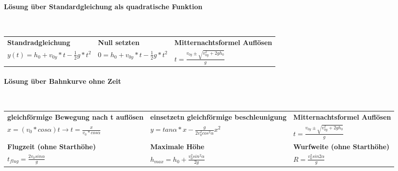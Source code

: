 \documentclass[10pt,a4paper]{article}
\begin{document}
        \paragraph{Lösung über Standardgleichung als quadratische Funktion}\mbox{}\\
        
        \begin{tabular}{p{} p{} p{}}
            \textbf{Standradgleichung} &
            \textbf{Null setzten} &
            \textbf{Mitternachtsformel Auflösen} \\[4pt]
            
            $y(t)=h_0+v_{0y}*t-\frac{1}{2}g*t^2$ &
            $0=h_0+v_{0y}*t-\frac{1}{2}g*t^2$ &
            $t=\frac{v_{0y}\pm\sqrt{v_{0y}^2+2gh_0}}{g}$ \\[10pt]
            
        \end{tabular}
            
        \paragraph{Lösung über Bahnkurve ohne Zeit}\mbox{}\\
        
        \begin{tabular}{p{} p{} p{}}
            \textbf{gleichförmige Bewegung nach t auflösen} &
            \textbf{einsetzetn gleichförmige beschleunigung} &
            \textbf{Mitternachtsformel Auflösen} \\[4pt]
            
            $x=(v_0*cos\alpha)t \rightarrow t=\frac{x}{v_0*cos\alpha}$ &
            $y=tan\alpha*x-\frac{g}{2v_0^2cos^2\alpha}x^2$ &
            $t=\frac{v_{0y}\pm\sqrt{v_{0y}^2+2gh_0}}{g}$ \\[10pt]
            
            \textbf{Flugzeit (ohne Starthöhe)} &
            \textbf{Maximale Höhe} &
            \textbf{Wurfweite (ohne Starthöhe)} \\[4pt]
            
            $t_{flug}=\frac{2v_0sin\alpha}{g}$ &
            $h_{max}=h_0+\frac{v_0^2sin^2\alpha}{2g}$ &
            $R=\frac{v_0^2sin2\alpha}{g}$ \\[10pt]
        
        \end{tabular}
		
\end{document}
